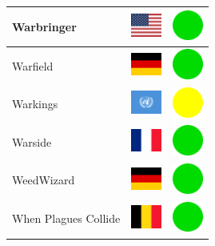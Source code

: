 \documentclass[12pt, a4paper, twoside]{report}
\begin{document}
\begin{center}
\begin{longtable}{|p{5cm}|p{2cm}|p{2cm}|}
 Warbringer                                                 & \includegraphics[width=1cm]{4x3/us} &   \includegraphics[width=1cm]{likes/y} \\ \hline
 Warfield                                                   & \includegraphics[width=1cm]{4x3/de} &   \includegraphics[width=1cm]{likes/y} \\ \hline
 Warkings                                                   & \includegraphics[width=1cm]{4x3/un} &   \includegraphics[width=1cm]{likes/m} \\ \hline
 Warside                                                    & \includegraphics[width=1cm]{4x3/fr} &   \includegraphics[width=1cm]{likes/y} \\ \hline
 WeedWizard                                                 & \includegraphics[width=1cm]{4x3/de} &   \includegraphics[width=1cm]{likes/y} \\ \hline
 When Plagues Collide                                       & \includegraphics[width=1cm]{4x3/be} &   \includegraphics[width=1cm]{likes/y} \\ \hline

\end{longtable}
\end{center}
\end{document}
